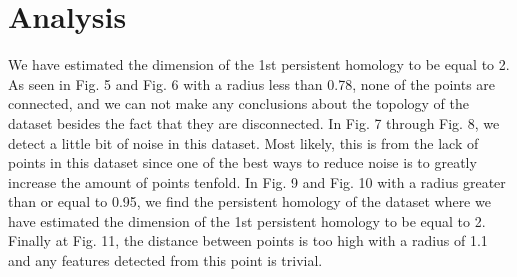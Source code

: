 \documentclass[letterpaper, 12pt]{report}
\begin{document}
	\section{Analysis}
	We have estimated the dimension of the 1st persistent homology to be equal to 2. As seen in Fig. 5 and Fig. 6 with a radius less than 0.78, none of the points are connected, and we can not make any conclusions about the topology of the dataset besides the fact that they are disconnected. In Fig. 7 through Fig. 8, we detect a little bit of noise in this dataset. Most likely, this is from the lack of points in this dataset since one of the best ways to reduce noise is to greatly increase the amount of points tenfold. In Fig. 9 and Fig. 10 with a radius greater than or equal to 0.95, we find the persistent homology of the dataset where we have estimated the dimension of the 1st persistent homology to be equal to 2. Finally at Fig. 11, the distance between points is too high with a radius of 1.1 and any features detected from this point is trivial. 
\end{document}
